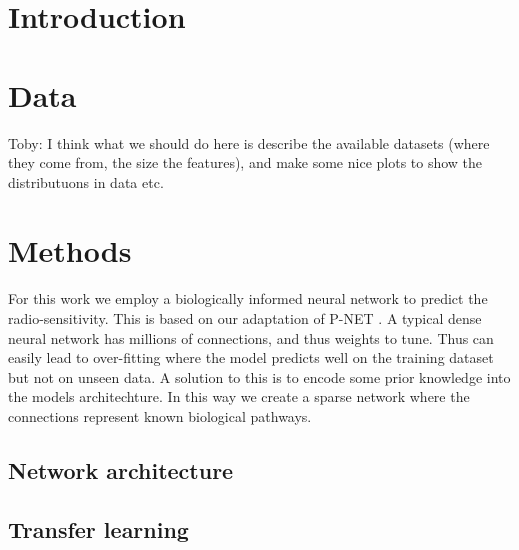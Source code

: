 \documentclass[NOTE, disdraft=true, UKenglish]{\DISCDTLATEXPATH UCLCDTDISdoc}
\begin{document}
\maketitle

\tableofcontents

\clearpage


\newpage

\newpage
\section{Introduction}
\label{sec:introduction}
%
\section{Data}
\label{sec:data}
{\color{red}Toby: I think what we should do here is describe the available datasets (where they come from, the size the features), and make some nice plots to show the distributuons in data etc.}
\section{Methods}
\label{sec:method}
For this work we employ a biologically informed neural network to predict the radio-sensitivity. This is based on our adaptation of P-NET \cite{}. A typical dense neural network has millions of connections, and thus weights to tune. Thus can easily lead to over-fitting where the model predicts well on the training dataset but not on unseen data. A solution to this is to encode some prior knowledge into the models architechture. In this way we create a sparse network where the connections represent known biological pathways.
\subsection{Network architecture}
\subsection{Transfer learning}
\end{document}
